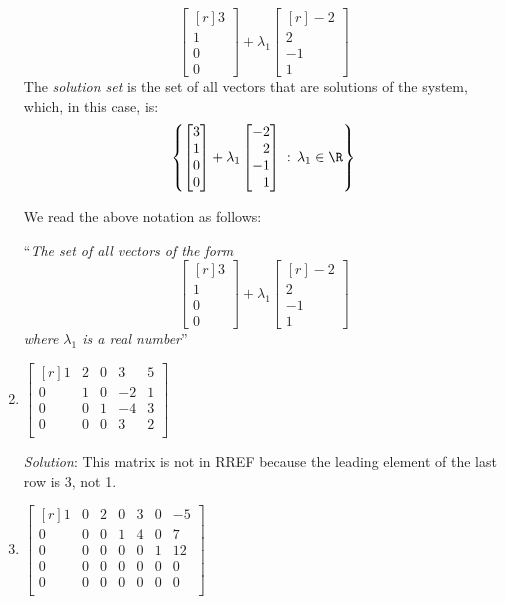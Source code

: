 \documentclass[12pt]{article}
\begin{document}
\begin{enumerate}
\[\begin{bmatrix*}[r]3\\1\\0\\0\end{bmatrix*}+
\lambda_1
\begin{bmatrix*}[r]-2\\2\\-1\\1\end{bmatrix*}
\]
The \emph{solution set} is the set of all vectors that are solutions of the system, which, in this case, is:
\[
\left\{
\begin{bmatrix*}[r]3\\1\\0\\0\end{bmatrix*}+
\lambda_1
\begin{bmatrix*}[r]-2\\2\\-1\\1\end{bmatrix*}
\;:\,\lambda_1\in\R\right\}
\]

We read the above notation as follows:

``\emph{The set of all vectors of the form
\[
\begin{bmatrix*}[r]3\\1\\0\\0\end{bmatrix*}+
\lambda_1
\begin{bmatrix*}[r]-2\\2\\-1\\1\end{bmatrix*}
\]
where $\lambda_1$ is a real number}''
\proofend


\bigskip
\item
$\begin{bmatrix*}[r]
1 & 2 & 0 &  3 & 5\\
0 & 1 & 0 & -2 & 1\\
0 & 0 & 1 & -4 & 3\\
0 & 0 & 0 &  3  & 2\\
\end{bmatrix*}$

\emph{Solution}: This matrix is not in RREF because the leading element of the last row is 3, not 1.
\proofend

\bigskip
\item
$\begin{bmatrix*}[r]
1 & 0 & 2 & 0 & 3 & 0 & -5\\
0 & 0 & 0 & 1 & 4 & 0 & 7\\
0 & 0 & 0 & 0 & 0 & 1 & 12\\
0 & 0 & 0 & 0 & 0 & 0 & 0\\
0 & 0 & 0 & 0 & 0 & 0 & 0\\
\end{bmatrix*}$


\end{enumerate}
\end{document}

